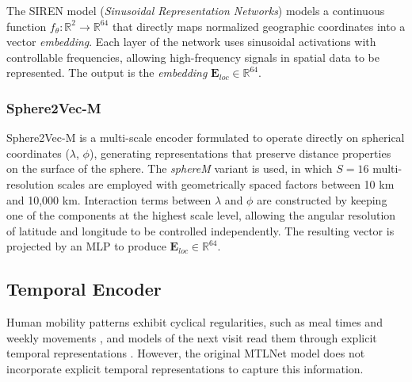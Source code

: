 The SIREN model (\textit{Sinusoidal Representation Networks}) \cite{rußwurm2024geographiclocationencodingspherical} models a continuous function $f_\theta : \mathbb{R}^2 \rightarrow \mathbb{R}^{64}$ that directly maps normalized geographic coordinates into a vector \textit{embedding}. Each layer of the network uses sinusoidal activations with controllable frequencies, allowing high-frequency signals in spatial data to be represented. The output is the \textit{embedding} $\mathbf{E}_{loc} \in \mathbb{R}^{64}$.

\subsubsection{Sphere2Vec-M}

Sphere2Vec-M \cite{mai2023sphere2vecgeneralpurposelocationrepresentation} is a multi-scale encoder formulated to operate directly on spherical coordinates ($\lambda$, $\phi$), generating representations that preserve distance properties on the surface of the sphere. The \textit{sphereM} variant is used, in which $S=16$ multi-resolution scales are employed with geometrically spaced factors between 10 km and 10,000 km. Interaction terms between $\lambda$ and $\phi$ are constructed by keeping one of the components at the highest scale level, allowing the angular resolution of latitude and longitude to be controlled independently. The resulting vector is projected by an MLP to produce $\mathbf{E}_{loc} \in \mathbb{R}^{64}$.

\subsection{Temporal Encoder}

Human mobility patterns exhibit cyclical regularities, such as meal times and weekly movements \cite{cho2011friendship}, and models of the next visit read them through explicit temporal representations \cite{sun2020go}. However, the original MTLNet model does not incorporate explicit temporal representations to capture this information.

